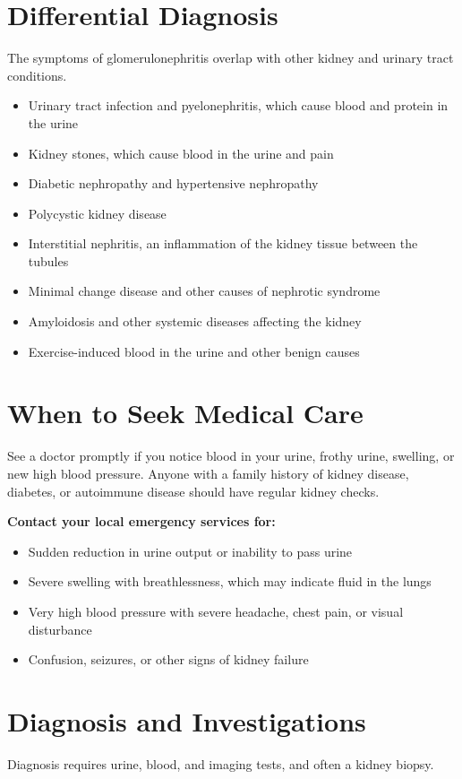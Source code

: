 \section*{Differential Diagnosis}
The symptoms of glomerulonephritis overlap with other kidney and urinary tract conditions.

\begin{itemize}
    \item Urinary tract infection and pyelonephritis, which cause blood and protein in the urine
    \item Kidney stones, which cause blood in the urine and pain
    \item Diabetic nephropathy and hypertensive nephropathy
    \item Polycystic kidney disease
    \item Interstitial nephritis, an inflammation of the kidney tissue between the tubules
    \item Minimal change disease and other causes of nephrotic syndrome
    \item Amyloidosis and other systemic diseases affecting the kidney
    \item Exercise-induced blood in the urine and other benign causes
\end{itemize}

\section*{When to Seek Medical Care}
See a doctor promptly if you notice blood in your urine, frothy urine, swelling, or new high blood pressure. Anyone with a family history of kidney disease, diabetes, or autoimmune disease should have regular kidney checks.

\textbf{Contact your local emergency services for:}
\begin{itemize}
    \item Sudden reduction in urine output or inability to pass urine
    \item Severe swelling with breathlessness, which may indicate fluid in the lungs
    \item Very high blood pressure with severe headache, chest pain, or visual disturbance
    \item Confusion, seizures, or other signs of kidney failure
\end{itemize}

\section*{Diagnosis and Investigations}
Diagnosis requires urine, blood, and imaging tests, and often a kidney biopsy.

